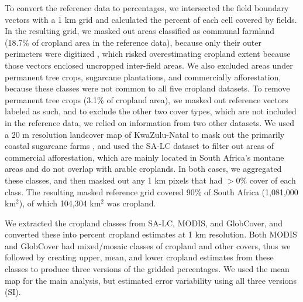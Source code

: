 \documentclass[a4paper]{article}
\begin{document}
To convert the reference data to percentages, we intersected the field boundary vectors with a 1 km grid and calculated the percent of each cell covered by fields. In the resulting grid, we masked out areas classified as communal farmland (18.7\% of cropland area in the reference data), because only their outer perimeters were digitized \citep{fourie_better_2009}, which risked overestimating cropland extent because those vectors enclosed uncropped inter-field areas. We also excluded areas under permanent tree crops, sugarcane plantations, and commercially afforestation, because these classes were not common to all five cropland datasets. To remove permanent tree crops (3.1\% of cropland area), we masked out reference vectors labeled as such, and to exclude the other two cover types, which are not included in the reference data, we relied on information from two other datasets. We used a 20 m resolution landcover map of KwaZulu-Natal to mask out the primarily coastal sugarcane farms \citep[93-100\% user's and 76-98\% producer's accuracy for sugarcane classes;][]{geoterraimage_2011_2013}, and used the SA-LC dataset to filter out areas of commercial afforestation, which are mainly located in South Africa's montane areas and do not overlap with arable croplands. In both cases, we aggregated these classes, and then masked out any 1 km pixels that had $>$0\% cover of each class. The resulting masked reference grid covered 90\% of South Africa (1,081,000 km$^2$), of which 104,304 km$^2$ was cropland. 

We extracted the cropland classes from SA-LC, MODIS, and GlobCover, and converted these into percent cropland estimates at 1 km resolution. Both MODIS and GlobCover had mixed/mosaic classes of cropland and other covers, thus we followed \citet{fritz_mapping_2015} by creating upper, mean, and lower cropland estimates from these classes to produce three versions of the gridded percentages. We used the mean map for the main analysis, but estimated error variability using all three versions (SI).

\vspace{-0.3 cm}
\end{document}
